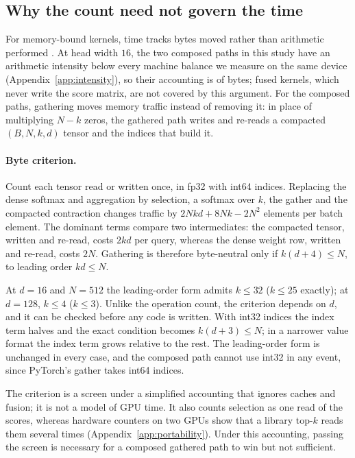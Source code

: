 \subsection{Why the count need not govern the time}
\label{sec:roofline}

For memory-bound kernels, time tracks bytes moved rather than arithmetic
performed \citep{williams2009roofline}. At head width $16$, the two composed
paths in this study have an arithmetic intensity below every machine balance we
measure on the same device (Appendix~\ref{app:intensity}), so their accounting
is of bytes; fused kernels, which never write the score matrix, are not covered
by this argument. For the composed paths, gathering moves memory traffic
instead of removing it: in place of multiplying $N-k$ zeros, the gathered path
writes and re-reads a compacted $(B,N,k,d)$ tensor and the indices that build
it.

\paragraph{Byte criterion.} Count each tensor read or written once, in fp32
with int64 indices. Replacing the dense softmax and aggregation by selection, a
softmax over $k$, the gather and the compacted contraction changes traffic by
$2Nkd + 8Nk - 2N^2$ elements per batch element. The dominant terms compare two
intermediates: the compacted tensor, written and re-read, costs $2kd$ per query,
whereas the dense weight row, written and re-read, costs $2N$. Gathering is
therefore byte-neutral only if $k(d+4) \le N$, to leading order $kd \le N$.

At $d{=}16$ and $N{=}512$ the leading-order form admits $k \le 32$ ($k \le 25$
exactly); at $d{=}128$, $k \le 4$ ($k \le 3$). Unlike the operation count, the
criterion depends on $d$, and it can be checked before any code is written.
With int32 indices the index term halves and the exact
condition becomes $k(d+3) \le N$; in a narrower value format the index term
grows relative to the rest. The leading-order form is unchanged in every case,
and the composed path cannot use int32 in any event, since PyTorch's gather
takes int64 indices.

The criterion is a screen under a simplified accounting that ignores caches and
fusion; it is not a model of GPU time. It also counts selection as one read of
the scores, whereas hardware counters on two GPUs show that a library top-$k$
reads them several times (Appendix~\ref{app:portability}). Under this
accounting, passing the screen is necessary for a composed gathered path to win
but not sufficient.

